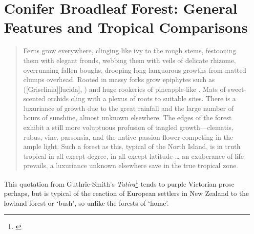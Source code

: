 \chapter{Conifer Broadleaf Forest: General Features and Tropical Comparisons}

\begin{quote}
	Ferns grow everywhere, clinging like ivy to the rough stems, festooning them with elegant fronds, webbing them with veils of delicate rhizome, overrunning fallen boughs, drooping long languorous growths from matted clumps overhead.
	Rooted in massy forks grow epiphytes such as  ([Griselinia][lucida], ) and huge rookeries of pineapple-like .
	Mats of sweet-scented orchids cling with a plexus of roots to suitable sites.
	There is a luxuriance of growth due to the great rainfall and the large number of hours of sunshine, almost unknown elsewhere.
	The edges of the forest exhibit a still more voluptuous profusion of tangled growth---clematis, rubus, vine, parsonsia, and the native passion-flower competing in the ample light.
	Such a forest as this, typical of the North Island, is in truth tropical in all except degree, in all except latitude … an exuberance of life prevails, a luxuriance unknown elsewhere save in the true tropical zone.
\end{quote}

This quotation from  Guthrie-Smith's \emph{Tutira}\footnote{\cite{guthriesmith1926tutira}} tends to purple Victorian prose perhaps, but is typical of the reaction of European settlers in New Zealand to the lowland forest or `bush', so unlike the forests of `home'.

